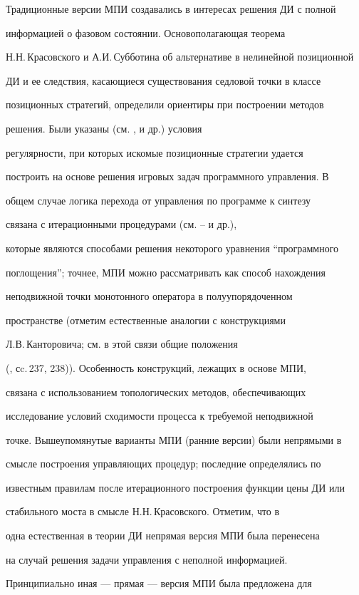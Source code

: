 Традиционные версии МПИ создавались в интересах решения ДИ с полной


информацией о фазовом состоянии. Основополагающая теорема


Н.Н.\,Красовского и А.И.\,Субботина об альтернативе в нелинейной позиционной


ДИ и ее следствия, касающиеся существования седловой точки в классе


позиционных стратегий, определили ориентиры при построении методов


решения. Были указаны (см. \cite{2}, \cite{3} и др.) условия


регулярности, при которых искомые позиционные стратегии удается


построить на основе решения игровых задач программного управления. В


общем случае логика перехода от управления по программе к синтезу


связана с итерационными процедурами (см. \cite{15}--\cite{20} и др.),


которые являются способами решения некоторого уравнения ``программного


поглощения''; точнее, МПИ можно рассматривать как способ нахождения


неподвижной точки монотонного оператора в полуупорядоченном


пространстве (отметим естественные аналогии с конструкциями


Л.В.\,Канторовича; см. в этой связи общие положения


(\cite{21}, сc.\,237, 238)). Особенность конструкций, лежащих в основе МПИ,


связана с использованием топологических методов, обеспечивающих


исследование условий сходимости процесса к требуемой неподвижной


точке. Вышеупомянутые варианты МПИ (ранние версии) были непрямыми в


смысле построения управляющих процедур; последние определялись по


известным правилам после итерационного построения функции цены ДИ или


стабильного моста в смысле Н.Н.\,Красовского. Отметим, что в \cite{22}


одна естественная в теории ДИ непрямая версия МПИ была перенесена


на случай решения задачи управления с неполной информацией.


Принципиально иная --- прямая --- версия МПИ была предложена для


